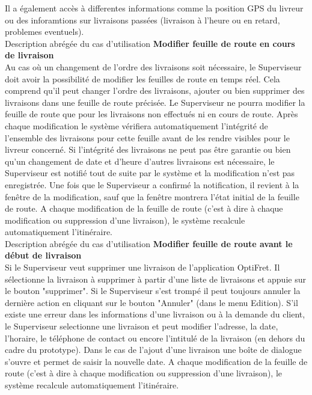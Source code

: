 \documentclass[a4paper]{report}
\begin{document}
Il a également accès à differentes informations comme la position GPS du
livreur ou des inforamtions sur livraisons passées (livraison à l'heure ou en
retard, problemes eventuels). \\

Description abrégée du cas d'utilisation \textbf{Modifier feuille de route en
    cours de livraison} \\

Au cas où un changement de l'ordre des livraisons soit nécessaire, le
Superviseur doit avoir la possibilité de modifier les feuilles de route en
temps réel. Cela comprend qu'il peut changer l'ordre des livraisons, ajouter ou
bien supprimer des livraisons dans une feuille de route précisée. Le
Superviseur ne pourra modifier la feuille de route que pour les livraisons non
effectués ni en cours de route. Après chaque modification le système vérifiera
automatiquement l'intégrité de l'ensemble des livraisons pour cette feuille
avant de les rendre visibles pour le livreur concerné.
Si l'intégrité des livraisons ne peut pas être garantie ou bien qu'un
changement de date et d'heure d'autres livraisons est nécessaire, le
Superviseur est notifié tout de suite par le système et la modification n'est
pas enregistrée. Une fois que le Superviseur a confirmé la notification, il
revient à la fenêtre de la modification, sauf que la fenêtre montrera l'état
initial de la feuille de route.  A chaque modification de la feuille de route
(c'est à dire à chaque modification ou suppression d'une livraison), le système
recalcule automatiquement l'itinéraire. \\

Description abrégée du cas d'utilisation \textbf{Modifier feuille de route
    avant le début de livraison} \\

Si le Superviseur veut supprimer une livraison de l'application OptiFret. Il
sélectionne la livraison à supprimer à partir d'une liste de livraisons et
appuie sur le bouton "supprimer". Si le Superviseur s'est trompé il peut
toujours annuler la dernière action en cliquant sur le bouton "Annuler" (dans
le menu Edition).  S'il existe une erreur dans les informations d'une livraison
ou à la demande du client, le Superviseur selectionne une livraison et peut
modifier l'adresse, la date, l'horaire, le téléphone de contact ou encore
l'intitulé de la livraison (en dehors du cadre du prototype). Dans le cas de
l'ajout d'une livraison une boîte de dialogue s'ouvre et permet de saisir la
nouvelle date.  A chaque modification de la feuille de route (c'est à dire à
chaque modification ou suppression d'une livraison), le système recalcule
automatiquement l'itinéraire.\\
\end{document}
